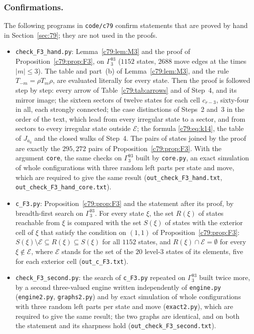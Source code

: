 \subsubsection{Confirmations.}\label{app:79:checks}
The following programs in \texttt{code/c79} confirm statements that are proved by hand in Section~\ref{sec:79}; they are not used in the proofs.
\begin{itemize}
\item \texttt{check\_F3\_hand.py}: Lemma~\ref{c79:lem:M3} and the proof of Proposition~\ref{c79:prop:F3}, on $\Gamma^{93}_3$ ($1152$ states, $2688$ move edges at the times $|m|\le3$). The table and part~(b) of Lemma~\ref{c79:lem:M3}, and the rule $T_{-m}=\rho T_m\rho$, are evaluated literally for every state. Then the proof is followed step by step: every arrow of Table~\ref{c79:tab:arrows} and of Step~4, and its mirror image; the sixteen sectors of twelve states for each cell $c_{r-3}$, sixty-four in all, each strongly connected; the case distinctions of Steps~2 and~3 in the order of the text, which lead from every irregular state to a sector, and from sectors to every irregular state outside $\mathcal E$; the formula \eqref{c79:eq:k14}, the table of $J_{a_0}$ and the closed walks of Step~4. The pairs of states joined by the proof are exactly the $295{,}272$ pairs of Proposition~\ref{c79:prop:F3}. With the argument \texttt{core}, the same checks on $\Gamma^{93}_3$ built by \texttt{core.py}, an exact simulation of whole configurations with three random left parts per state and move, which are required to give the same result (\texttt{out\_check\_F3\_hand.txt}, \texttt{out\_check\_F3\_hand\_core.txt}).
\item \texttt{c\_F3.py}: Proposition~\ref{c79:prop:F3} and the statement after its proof, by breadth-first search on $\Gamma^{93}_3$. For every state $\xi$, the set $R(\xi)$ of states reachable from $\xi$ is compared with the set $S(\xi)$ of states with the exterior cell of $\xi$ that satisfy the condition on $(1,1)$ of Proposition~\ref{c79:prop:F3}: $S(\xi)\setminus\mathcal E\subseteq R(\xi)\subseteq S(\xi)$ for all $1152$ states, and $R(\xi)\cap\mathcal E=\emptyset$ for every $\xi\notin\mathcal E$, where $\mathcal E$ stands for the set of the $20$ level-$3$ states of its elements, five for each exterior cell (\texttt{out\_c\_F3.txt}).
\item \texttt{check\_F3\_second.py}: the search of \texttt{c\_F3.py} repeated on $\Gamma^{93}_3$ built twice more, by a second three-valued engine written independently of \texttt{engine.py} (\texttt{engine2.py}, \texttt{graphs2.py}) and by exact simulation of whole configurations with three random left parts per state and move (\texttt{exact2.py}), which are required to give the same result; the two graphs are identical, and on both the statement and its sharpness hold (\texttt{out\_check\_F3\_second.txt}).

\end{itemize}
